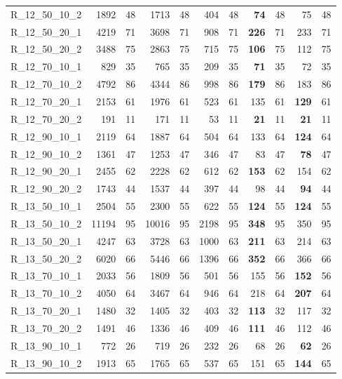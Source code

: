 \documentclass{article}
\begin{document}
\begin{longtable}{lrrrrrrrrrr}
R\_12\_50\_10\_2 & 1892 & 48 & 1713 & 48 & 404 & 48 & \textbf{74} & 48 & 75 & 48 \\
R\_12\_50\_20\_1 & 4219 & 71 & 3698 & 71 & 908 & 71 & \textbf{226} & 71 & 233 & 71 \\
R\_12\_50\_20\_2 & 3488 & 75 & 2863 & 75 & 715 & 75 & \textbf{106} & 75 & 112 & 75 \\
R\_12\_70\_10\_1 & 829 & 35 & 765 & 35 & 209 & 35 & \textbf{71} & 35 & 72 & 35 \\
R\_12\_70\_10\_2 & 4792 & 86 & 4344 & 86 & 998 & 86 & \textbf{179} & 86 & 183 & 86 \\
R\_12\_70\_20\_1 & 2153 & 61 & 1976 & 61 & 523 & 61 & 135 & 61 & \textbf{129} & 61 \\
R\_12\_70\_20\_2 & 191 & 11 & 171 & 11 & 53 & 11 & \textbf{21} & 11 & \textbf{21} & 11 \\
R\_12\_90\_10\_1 & 2119 & 64 & 1887 & 64 & 504 & 64 & 133 & 64 & \textbf{124} & 64 \\
R\_12\_90\_10\_2 & 1361 & 47 & 1253 & 47 & 346 & 47 & 83 & 47 & \textbf{78} & 47 \\
R\_12\_90\_20\_1 & 2455 & 62 & 2228 & 62 & 612 & 62 & \textbf{153} & 62 & 154 & 62 \\
R\_12\_90\_20\_2 & 1743 & 44 & 1537 & 44 & 397 & 44 & 98 & 44 & \textbf{94} & 44 \\
R\_13\_50\_10\_1 & 2504 & 55 & 2300 & 55 & 622 & 55 & \textbf{124} & 55 & \textbf{124} & 55 \\
R\_13\_50\_10\_2 & 11194 & 95 & 10016 & 95 & 2198 & 95 & \textbf{348} & 95 & 350 & 95 \\
R\_13\_50\_20\_1 & 4247 & 63 & 3728 & 63 & 1000 & 63 & \textbf{211} & 63 & 214 & 63 \\
R\_13\_50\_20\_2 & 6020 & 66 & 5446 & 66 & 1396 & 66 & \textbf{352} & 66 & 366 & 66 \\
R\_13\_70\_10\_1 & 2033 & 56 & 1809 & 56 & 501 & 56 & 155 & 56 & \textbf{152} & 56 \\
R\_13\_70\_10\_2 & 4050 & 64 & 3467 & 64 & 946 & 64 & 218 & 64 & \textbf{207} & 64 \\
R\_13\_70\_20\_1 & 1480 & 32 & 1405 & 32 & 403 & 32 & \textbf{113} & 32 & 117 & 32 \\
R\_13\_70\_20\_2 & 1491 & 46 & 1336 & 46 & 409 & 46 & \textbf{111} & 46 & 112 & 46 \\
R\_13\_90\_10\_1 & 772 & 26 & 719 & 26 & 232 & 26 & 68 & 26 & \textbf{62} & 26 \\
R\_13\_90\_10\_2 & 1913 & 65 & 1765 & 65 & 537 & 65 & 151 & 65 & \textbf{144} & 65 \\

\end{longtable}
\end{document}
